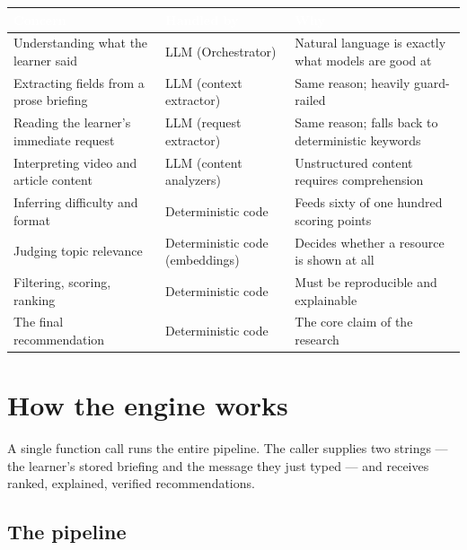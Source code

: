 \documentclass[11pt,a4paper]{article}
\newcommand{\thead}[1]{\textcolor{white}{\bfseries\small #1}}
\newcommand{\headrow}{\rowcolor{navy}}
\begin{document}
\vspace{4pt}
\begin{tabularx}{\textwidth}{>{\raggedright\arraybackslash}p{5.2cm} >{\raggedright\arraybackslash}p{4.2cm} >{\raggedright\arraybackslash}X}
\headrow \thead{Concern} & \thead{Handled by} & \thead{Why} \\
\midrule
Understanding what the learner said & LLM (Orchestrator) & Natural language is exactly what models are good at \\
\rowcolor{altshade} Extracting fields from a prose briefing & LLM (context extractor) & Same reason; heavily guard-railed \\
Reading the learner's immediate request & LLM (request extractor) & Same reason; falls back to deterministic keywords \\
\rowcolor{altshade} Interpreting video and article content & LLM (content analyzers) & Unstructured content requires comprehension \\
Inferring difficulty and format & Deterministic code & Feeds sixty of one hundred scoring points \\
\rowcolor{altshade} Judging topic relevance & Deterministic code (embeddings) & Decides whether a resource is shown at all \\
Filtering, scoring, ranking & Deterministic code & Must be reproducible and explainable \\
\rowcolor{altshade} The final recommendation & Deterministic code & The core claim of the research \\
\bottomrule
\end{tabularx}

\newpage
\section{How the engine works}

A single function call runs the entire pipeline. The caller supplies two
strings --- the learner's stored briefing and the message they just typed ---
and receives ranked, explained, verified recommendations.

\subsection{The pipeline}
\end{document}
